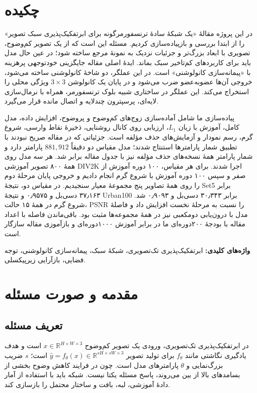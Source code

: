 \chapter*{چکیده}

در این پروژه مقالهٔ «یک شبکهٔ سادهٔ ترنسفورمرگونه برای ابرتفکیک‌پذیری سبک تصویر» را از ابتدا بررسی و بازپیاده‌سازی کردیم. مسئله این است که از یک تصویر کم‌وضوح، تصویری با ابعاد بزرگ‌تر و جزئیات نزدیک به نمونهٔ مرجع ساخته شود؛ در عین حال مدل باید برای کاربردهای کم‌تاخیر سبک بماند. ایدهٔ اصلی مقاله جایگزینی خودتوجهی پرهزینه با «پیمانه‌سازی کانولوشنی» است. در این عملگر، دو شاخهٔ کانولوشنی ساخته می‌شود، خروجی آن‌ها عضو‌به‌عضو ضرب می‌شود و در پایان یک کانولوشن $3\times3$ ویژگی محلی را استخراج می‌کند. این عملگر در ساختاری شبیه بلوک ترنسفورمر، همراه با نرمال‌سازی لایه‌ای، پرسپترون چندلایه و اتصال مانده قرار می‌گیرد.

پیاده‌سازی ما شامل آماده‌سازی زوج‌های کم‌وضوح و پروضوح، افزایش داده، مدل کامل، آموزش با زیان $L_1$، ارزیابی روی کانال روشنایی، ذخیرهٔ نقاط وارسی، شروع گرم، رسم نمودار و آزمایش‌های حذف مؤلفه است. جزئیاتی که در مقاله صریح نبودند با تطبیق شمار پارامترها استنتاج شدند؛ مدل مقیاس دو دقیقاً $881{,}912$ پارامتر دارد و شمار پارامتر همهٔ نسخه‌های حذف مؤلفه نیز با جدول مقاله برابر شد. هر سه مدل روی همهٔ ۸۰۰ تصویر آموزشی DIV2K اجرا شدند. برای هر مقیاس، ۱۰۰ دوره آموزش از صفر و سپس ۱۰۰ دوره آموزش با شروع گرم انجام دادیم و خروجی پایان مرحلهٔ دوم را روی همهٔ تصاویر پنج مجموعهٔ معیار سنجیدیم. در مقیاس دو، نتیجهٔ Set5 برابر ۳۷٫۱۶۳ دسی‌بل و ۰٫۹۵۷۵ و نتیجهٔ Urban100 برابر ۳۰٫۳۴۳ دسی‌بل و ۰٫۹۰۹۳ شد. شروع گرم در همهٔ ۱۵ حالت، PSNR را نسبت به مرحلهٔ نخست افزایش داد و فاصلهٔ مدل با درون‌یابی دو‌مکعبی نیز در همهٔ مجموعه‌ها مثبت بود. باقی‌ماندن فاصله با اعداد مقاله با بودجهٔ ۲۰۰‌دوره‌ای ما در برابر آموزش ۱۰۰۰‌دوره‌ای و بازآموزی مقاله سازگار است.

\textbf{واژه‌های کلیدی:} ابرتفکیک‌پذیری تک‌تصویری، شبکهٔ سبک، پیمانه‌سازی کانولوشنی، توجه فضایی، بازآرایی زیرپیکسلی.

\chapter{مقدمه و صورت مسئله}

\section{تعریف مسئله}

در ابرتفکیک‌پذیری تک‌تصویری، ورودی یک تصویر کم‌وضوح
$x\in\mathbb{R}^{H\times W\times3}$ است و هدف یادگیری نگاشتی مانند
$f_{\theta}$ برای تولید تصویر
$\hat{y}=f_{\theta}(x)\in\mathbb{R}^{sH\times sW\times3}$ است؛ $s$ ضریب بزرگ‌نمایی و $\theta$ پارامترهای مدل است. چون در فرایند کاهش وضوح بخشی از بسامدهای بالا از بین می‌روند، پاسخ مسئله یکتا نیست. شبکه باید با استفاده از آمار دادهٔ آموزشی، لبه، بافت و ساختار محتمل را بازسازی کند.


